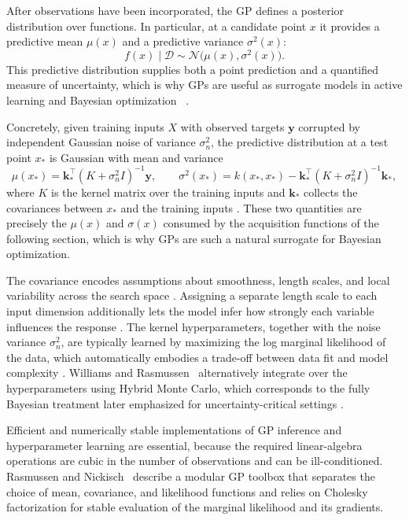 After observations have been incorporated, the GP defines a posterior
distribution over functions. In particular, at a candidate point $x$ it
provides a predictive mean $\mu(x)$ and a predictive variance
$\sigma^2(x)$:
\[
    f(x)\mid\mathcal{D}
    \sim
    \mathcal{N}\bigl(\mu(x),\sigma^2(x)\bigr).
\]
This predictive distribution supplies both a point prediction and a
quantified measure of uncertainty, which is why GPs are useful as surrogate
models in active learning and Bayesian optimization
~\cite{williams1995gaussian,rasmussen2010gaussian}.

Concretely, given training inputs $X$ with observed targets $\mathbf{y}$ corrupted by independent Gaussian noise of variance $\sigma_n^2$, the predictive distribution at a test point $x_\ast$ is Gaussian with mean and variance
\[
\mu(x_\ast) = \mathbf{k}_\ast^{\top}\left(K + \sigma_n^2 I\right)^{-1}\mathbf{y}, \qquad
\sigma^2(x_\ast) = k(x_\ast, x_\ast) - \mathbf{k}_\ast^{\top}\left(K + \sigma_n^2 I\right)^{-1}\mathbf{k}_\ast,
\]
where $K$ is the kernel matrix over the training inputs and $\mathbf{k}_\ast$ collects the covariances between $x_\ast$ and the training inputs \cite{williams1995gaussian,rasmussen2010gaussian}. These two quantities are precisely the $\mu(x)$ and $\sigma(x)$ consumed by the acquisition functions of the following section, which is why GPs are such a natural surrogate for Bayesian optimization.

The covariance encodes assumptions about smoothness, length scales, and local variability across the search space \cite{williams1995gaussian,rasmussen2010gaussian}. Assigning a separate length scale to each input dimension additionally lets the model infer how strongly each variable influences the response \cite{rasmussen2010gaussian}. The kernel hyperparameters, together with the noise variance $\sigma_n^2$, are typically learned by maximizing the log marginal likelihood of the data, which automatically embodies a trade-off between data fit and model complexity \cite{rasmussen2010gaussian}. Williams and Rasmussen~\cite{williams1995gaussian} alternatively integrate over the hyperparameters using Hybrid Monte Carlo, which corresponds to the fully Bayesian treatment later emphasized for uncertainty-critical settings \cite{riis2022bayesian}.

Efficient and numerically stable implementations of GP inference and hyperparameter learning are essential, because the required linear-algebra operations are cubic in the number of observations and can be ill-conditioned. Rasmussen and Nickisch~\cite{rasmussen2010gaussian} describe a modular GP toolbox that separates the choice of mean, covariance, and likelihood functions and relies on Cholesky factorization for stable evaluation of the marginal likelihood and its gradients.

